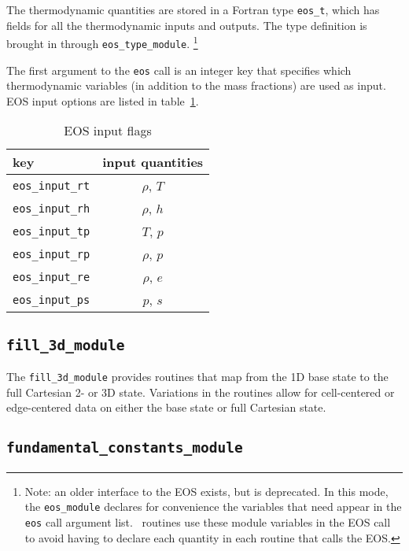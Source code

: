The thermodynamic quantities are stored in a Fortran type {\tt eos\_t},
which has fields for all the thermodynamic inputs and outputs.  The 
type definition is brought in through {\tt eos\_type\_module}.
\footnote{ Note: an older interface to the EOS exists, but is
  deprecated.  In this mode, the {\tt eos\_module} declares for
  convenience the variables that need appear in the {\tt eos} call
  argument list.  \maestro\ routines use these module variables in the
  EOS call to avoid having to declare each quantity in each routine
  that calls the EOS.}

The first argument to the {\tt eos} call is an integer key that
specifies which thermodynamic variables (in addition to the mass
fractions) are used as input.  EOS input options are listed 
in table~\ref{arch:table:eosinput}.

   \begin{table}[h]
   \caption{\label{arch:table:eosinput} EOS input flags}
   \begin{center}
   \begin{tabular}{lc}
   \hline
   key            & input quantities \\
   \hline
   {\tt eos\_input\_rt}       & $\rho$, $T$ \\
   {\tt eos\_input\_rh}       & $\rho$, $h$ \\
   {\tt eos\_input\_tp}       & $T$, $p$ \\
   {\tt eos\_input\_rp}       & $\rho$, $p$ \\
   {\tt eos\_input\_re}       & $\rho$, $e$ \\
   {\tt eos\_input\_ps}       & $p$, $s$ \\
   \hline
   \end{tabular}
   \end{center}
   \end{table}



\subsection{{\tt fill\_3d\_module}}

The {\tt fill\_3d\_module} provides routines that map from the 1D
base state to the full Cartesian 2- or 3D state.  Variations in the
routines allow for cell-centered or edge-centered data on either the
base state or full Cartesian state.

\subsection{\tt fundamental\_constants\_module}

